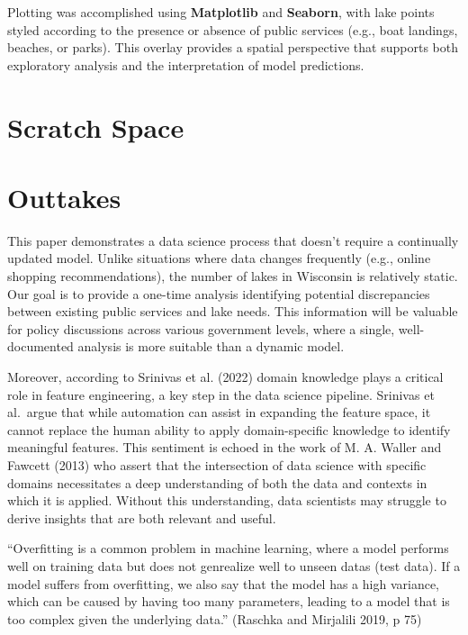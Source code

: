 \documentclass[
]{article}
\begin{document}
Plotting was accomplished using \textbf{Matplotlib} and
\textbf{Seaborn}, with lake points styled according to the presence or
absence of public services (e.g., boat landings, beaches, or parks).
This overlay provides a spatial perspective that supports both
exploratory analysis and the interpretation of model predictions.

\section{Scratch Space}\label{scratch-space}

\section{Outtakes}\label{outtakes}

This paper demonstrates a data science process that doesn't require a
continually updated model. Unlike situations where data changes
frequently (e.g., online shopping recommendations), the number of lakes
in Wisconsin is relatively static. Our goal is to provide a one-time
analysis identifying potential discrepancies between existing public
services and lake needs. This information will be valuable for policy
discussions across various government levels, where a single,
well-documented analysis is more suitable than a dynamic model.

Moreover, according to Srinivas et al. (2022) domain knowledge plays a
critical role in feature engineering, a key step in the data science
pipeline. Srinivas et al.~argue that while automation can assist in
expanding the feature space, it cannot replace the human ability to
apply domain-specific knowledge to identify meaningful features. This
sentiment is echoed in the work of M. A. Waller and Fawcett (2013) who
assert that the intersection of data science with specific domains
necessitates a deep understanding of both the data and contexts in which
it is applied. Without this understanding, data scientists may struggle
to derive insights that are both relevant and useful.

``Overfitting is a common problem in machine learning, where a model
performs well on training data but does not genrealize well to unseen
datas (test data). If a model suffers from overfitting, we also say that
the model has a high variance, which can be caused by having too many
parameters, leading to a model that is too complex given the underlying
data.'' (Raschka and Mirjalili 2019, p 75)
\end{document}
